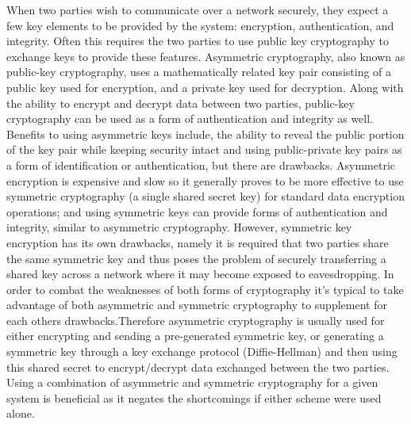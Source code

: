 When two parties  wish to communicate over a network securely, they expect a few key elements to be provided by the system: encryption, authentication, and integrity. Often this requires the two parties to use public key cryptography to exchange keys to provide these features. Asymmetric cryptography, also known as public-key cryptography, uses a mathematically related key pair consisting of a public key used for encryption, and a private key used for decryption. Along with the ability to encrypt and decrypt data between two parties, public-key cryptography can be used as a form of authentication and integrity as well. Benefits to using asymmetric keys include, the ability to reveal the public portion of the key pair while keeping security intact and using public-private key pairs as a form of identification or authentication, but there are drawbacks. Asymmetric encryption is expensive and slow so it generally proves to be more effective to use symmetric cryptography (a single shared secret key) for standard data encryption operations; and using symmetric keys can provide forms of authentication and integrity, similar to asymmetric cryptography. However, symmetric key encryption has its own drawbacks, namely it is required that two parties share the same symmetric key and thus poses the problem of securely transferring a shared key across a network where it may become exposed to eavesdropping. In order to combat the weaknesses of both forms of cryptography it's typical to take advantage of both asymmetric and symmetric cryptography to supplement for each others drawbacks.Therefore asymmetric cryptography is usually used for either encrypting and sending a pre-generated symmetric key, or generating a symmetric key through a key exchange protocol (Diffie-Hellman) and then using this shared secret to encrypt/decrypt data exchanged between the two parties. Using a combination of asymmetric and symmetric cryptography for a given system is beneficial as it negates the shortcomings if either scheme were used alone.

